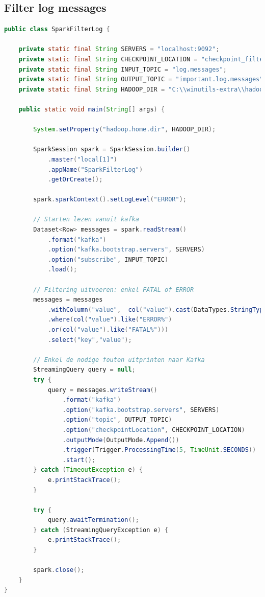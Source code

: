 \documentclass[a4paper,10pt,twoside]{report}
\begin{document}
\subsection{Filter log messages}
\begin{lstlisting}[language=Java]
public class SparkFilterLog {
	
	private static final String SERVERS = "localhost:9092";
	private static final String CHECKPOINT_LOCATION = "checkpoint_filterlogs";
	private static final String INPUT_TOPIC = "log.messages";
	private static final String OUTPUT_TOPIC = "important.log.messages";
	private static final String HADOOP_DIR = "C:\\winutils-extra\\hadoop";
	
	public static void main(String[] args) {
		
		System.setProperty("hadoop.home.dir", HADOOP_DIR);
		
		SparkSession spark = SparkSession.builder()
			.master("local[1]")
			.appName("SparkFilterLog")
			.getOrCreate();
		
		spark.sparkContext().setLogLevel("ERROR");
		
		// Starten lezen vanuit kafka
		Dataset<Row> messages = spark.readStream()
			.format("kafka")
			.option("kafka.bootstrap.servers", SERVERS)
			.option("subscribe", INPUT_TOPIC)
			.load();
		
		// Filtering uitvoeren: enkel FATAL of ERROR
		messages = messages
			.withColumn("value",  col("value").cast(DataTypes.StringType))
			.where(col("value").like("ERROR%")
			.or(col("value").like("FATAL%")))
			.select("key","value");
		
		// Enkel de nodige fouten uitprinten naar Kafka
		StreamingQuery query = null;
		try {
			query = messages.writeStream()
				.format("kafka")
				.option("kafka.bootstrap.servers", SERVERS)
				.option("topic", OUTPUT_TOPIC)
				.option("checkpointLocation", CHECKPOINT_LOCATION)
				.outputMode(OutputMode.Append())
				.trigger(Trigger.ProcessingTime(5, TimeUnit.SECONDS))
				.start();	
		} catch (TimeoutException e) {		
			e.printStackTrace();
		}
		
		try {
			query.awaitTermination();
		} catch (StreamingQueryException e) {
			e.printStackTrace();
		}
		
		spark.close();	
	}	
}
\end{lstlisting}

\newpage
\end{document}
